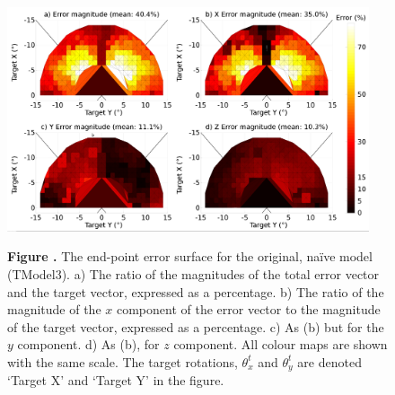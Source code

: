 \documentclass{frontiersSCNS}
\begin{document}
\begin{figure}[htb!]
\begin{center}
\includegraphics[width=0.95\textwidth]{./figures/errorsurface_TModel3.png}
\end{center}
\textbf{\label{errorsurfaceTM3} Figure .}
{ The end-point error surface for the original,
na\"ive model (TModel3). a) The
ratio of the magnitudes of the total error vector and the target
vector, expressed as a percentage. b) The ratio of the magnitude
of the $x$ component of the error vector to the magnitude of the
target vector, expressed as a percentage. c) As (b) but for the
$y$ component. d) As (b), for $z$ component. All colour maps are
shown with the same scale. The target rotations, $\theta_{x}^t$ and
$\theta_{y}^t$ are denoted `Target X' and `Target Y' in the figure.}
\end{figure}
\end{document}
